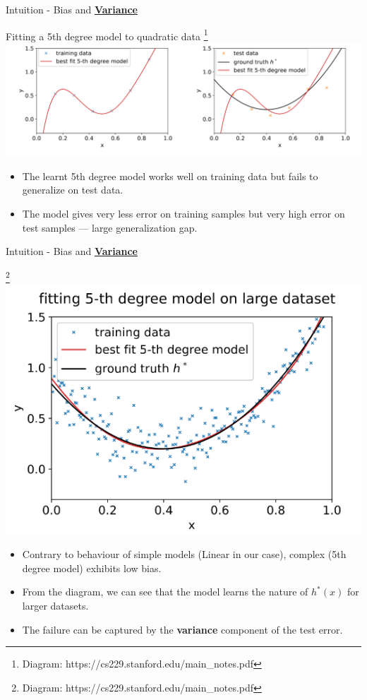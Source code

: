 \documentclass{beamer}
\begin{document}
\begin{frame}{Intuition - Bias and \underline{\textbf{Variance}}}
    \begin{center}
        \scriptsize{Fitting a 5th degree model to quadratic data \footnote{\tiny{Diagram: https://cs229.stanford.edu/main\_notes.pdf}}}
        \includegraphics[width=\linewidth]{images/biasvar/5D_on_small.png}
    \end{center}

    \begin{itemize}
        \item The learnt 5th degree model works well on training data but fails to generalize on test data.
        \item The model gives very less error on training samples but very high error on test samples — large generalization gap.
    \end{itemize}
\end{frame}

\begin{frame}{Intuition - Bias and \underline{\textbf{Variance}}}
    \begin{center}
        \scriptsize{\footnote{\tiny{Diagram: https://cs229.stanford.edu/main\_notes.pdf}}}
        \includegraphics[width=0.4\linewidth]{images/biasvar/5D_on_Large.png}
    \end{center}

    \begin{itemize}
        \item Contrary to behaviour of simple models (Linear in our case), complex (5th degree model) exhibits low bias.
        \item From the diagram, we can see that the model learns the nature of $h^*(x)$ for larger datasets.
        \item The failure can be captured by the \textbf{variance} component of the test error.
    \end{itemize} 
\end{frame}
\end{document}

